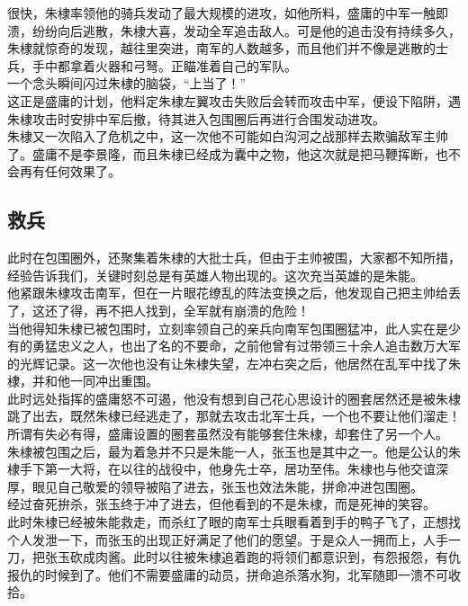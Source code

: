 \begin{multicols}{\theparacolNo}
很快，朱棣率领他的骑兵发动了最大规模的进攻，如他所料，盛庸的中军一触即溃，纷纷向后逃散，朱棣大喜，发动全军追击敌人。可是他的追击没有持续多久，朱棣就惊奇的发现，越往里突进，南军的人数越多，而且他们并不像是逃散的士兵，手中都拿着火器和弓弩。正瞄准着自己的军队。\\

一个念头瞬间闪过朱棣的脑袋，“上当了！”\\

这正是盛庸的计划，他料定朱棣左翼攻击失败后会转而攻击中军，便设下陷阱，遇朱棣攻击时安排中军后撤，待其进入包围圈后再进行合围发动进攻。\\

朱棣又一次陷入了危机之中，这一次他不可能如白沟河之战那样去欺骗敌军主帅了。盛庸不是李景隆，而且朱棣已经成为囊中之物，他这次就是把马鞭挥断，也不会再有任何效果了。\\

\subsection{救兵}
此时在包围圈外，还聚集着朱棣的大批士兵，但由于主帅被围，大家都不知所措，经验告诉我们，关键时刻总是有英雄人物出现的。这次充当英雄的是朱能。\\

他紧跟朱棣攻击南军，但在一片眼花缭乱的阵法变换之后，他发现自己把主帅给丢了，这还了得，再不把人找到，全军就有崩溃的危险！\\

当他得知朱棣已被包围时，立刻率领自己的亲兵向南军包围圈猛冲，此人实在是少有的勇猛忠义之人，也出了名的不要命，之前他曾有过带领三十余人追击数万大军的光辉记录。这一次他也没有让朱棣失望，左冲右突之后，他居然在乱军中找了朱棣，并和他一同冲出重围。\\

此时远处指挥的盛庸怒不可遏，他没有想到自己花心思设计的圈套居然还是被朱棣跳了出去，既然朱棣已经逃走了，那就去攻击北军士兵，一个也不要让他们溜走！\\

所谓有失必有得，盛庸设置的圈套虽然没有能够套住朱棣，却套住了另一个人。\\

朱棣被包围之后，最为着急并不只是朱能一人，张玉也是其中之一。他是公认的朱棣手下第一大将，在以往的战役中，他身先士卒，居功至伟。朱棣也与他交谊深厚，眼见自己敬爱的领导被陷了进去，张玉也效法朱能，拼命冲进包围圈。\\

经过奋死拚杀，张玉终于冲了进去，但他看到的不是朱棣，而是死神的笑容。\\

此时朱棣已经被朱能救走，而杀红了眼的南军士兵眼看着到手的鸭子飞了，正想找个人发泄一下，而张玉的出现正好满足了他们的愿望。于是众人一拥而上，人手一刀，把张玉砍成肉酱。此时以往被朱棣追着跑的将领们都意识到，有怨报怨，有仇报仇的时候到了。他们不需要盛庸的动员，拼命追杀落水狗，北军随即一溃不可收拾。\\
\ifnum{}
	\end{multicols}
\fi
\newpage
